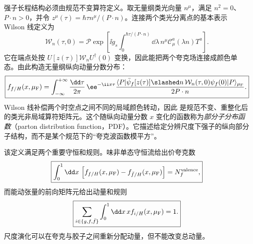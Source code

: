 强子长程结构必须由规范不变算符定义。取无量纲类光向量 $n^\mu$，满足 $n^2=0$、$P\cdot n>0$，并令 $z^\mu(\tau)=\hbar\tau n^\mu/(P\cdot n)$。连接两个类光分离点的基本表示 Wilson 线定义为
\begin{equation}
 \boxed{
 \mathcal W_n(\tau,0)
 =\mathcal P\exp\!\left[
 \ii g_s\int_0^{\hbar\tau/(P\cdot n)}\dd\lambda\,
 n^\mu\mathscr C_\mu^a(\lambda n)T^a
 \right].}
 \label{eq:dis-lightlike-wilson-line-dp68}
\end{equation}
它在端点处按 $U[z(\tau)]\mathcal W_nU^\dagger(0)$ 变换，因此能把两个夸克场连接成颜色单态。由此构造无量纲纵向动量分数分布：
\begin{equation}
 \boxed{
 f_{f/H}(x,\mu_{\rm F})
 =\int_{-\infty}^{+\infty}\frac{\dd\tau}{2\pi}\,
 \ee^{-\ii x\tau}
 \frac{\langle P|\bar\psi_f[z(\tau)]\slashed n\,
 \mathcal W_n(\tau,0)\psi_f(0)|P\rangle_{\mu_{\rm F}}}{2P\cdot n}.}
 \label{eq:pdf-operator-definition-dp14}
\end{equation}
Wilson 线补偿两个时空点之间不同的局域颜色转动，因此 是规范不变、重整化后的类光非局域算符矩阵元。这个随纵向动量分数 $x$ 变化的函数称为\emph{部分子分布函数}（parton distribution function，PDF）。它描述给定分辨尺度下强子的纵向部分子结构，而不是某个规范下的“夸克波函数模平方”。

该定义满足两个重要守恒和规则。味非单态守恒流给出价夸克数
\begin{equation}
 \boxed{
 \int_0^1\dd x\,
 \left[f_{f/H}(x,\mu_{\rm F})-f_{\bar f/H}(x,\mu_{\rm F})\right]
 =N_f^{\rm valence},}
 \label{eq:pdf-valence-sum-rule-dp13}
\end{equation}
而能动张量的前向矩阵元给出动量和规则
\begin{equation}
 \boxed{
 \sum_{i\in\{g,f,\bar f\}}
 \int_0^1\dd x\,x f_{i/H}(x,\mu_{\rm F})=1.}
 \label{eq:pdf-momentum-sum-rule-dp13}
\end{equation}
尺度演化可以在夸克与胶子之间重新分配动量，但不能改变总动量。

